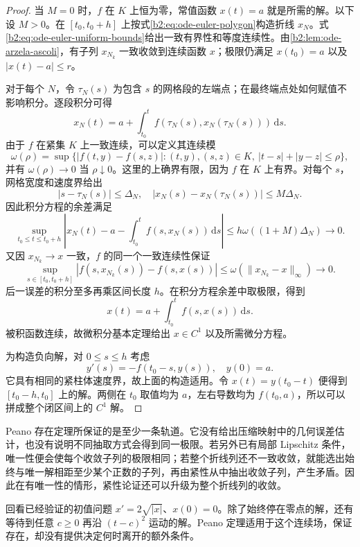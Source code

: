 \begin{proof}
当 \(M=0\) 时，\(f\) 在 \(K\) 上恒为零，常值函数 \(x(t)=a\) 就是所需的解。以下设 \(M>0\)。在 \([t_0,t_0+h]\) 上按式\eqref{b2:eq:ode-euler-polygon}构造折线 \(x_N\)。式\eqref{b2:eq:ode-euler-uniform-bounds}给出一致有界性和等度连续性。由\cref{b2:lem:ode-arzela-ascoli}，有子列 \(x_{N_k}\) 一致收敛到连续函数 \(x\)；极限仍满足 \(x(t_0)=a\) 以及 \(|x(t)-a|\leq r\)。

对于每个 \(N\)，令 \(\tau_N(s)\) 为包含 \(s\) 的网格段的左端点；在最终端点处如何赋值不影响积分。逐段积分可得
\[
 x_N(t)=a+\int_{t_0}^t
       f(\tau_N(s),x_N(\tau_N(s)))\,\mathrm ds.
\]
由于 \(f\) 在紧集 \(K\) 上一致连续，可以定义其连续模
\[
 \omega(\rho)=\sup\bigl\{|f(t,y)-f(s,z)|:
 (t,y),(s,z)\in K,\ |t-s|+|y-z|\leq\rho\bigr\},
\]
并有 \(\omega(\rho)\to0\) 当 \(\rho\downarrow0\)。这里的上确界有限，因为 \(f\) 在 \(K\) 上有界。对每个 \(s\)，网格宽度和速度界给出
\[
 |s-\tau_N(s)|\leq\Delta_N,\quad
 |x_N(s)-x_N(\tau_N(s))|\leq M\Delta_N.
\]
因此积分方程的余差满足
\[
 \sup_{t_0\leq t\leq t_0+h}
 \left|x_N(t)-a-\int_{t_0}^t f(s,x_N(s))\,\mathrm ds\right|
 \leq h\omega((1+M)\Delta_N)\longrightarrow0.
\]
又因 \(x_{N_k}\to x\) 一致，\(f\) 的同一个一致连续性保证
\[
 \sup_{s\in[t_0,t_0+h]}|f(s,x_{N_k}(s))-f(s,x(s))|
 \leq\omega(\|x_{N_k}-x\|_\infty)\longrightarrow0.
\]
后一误差的积分至多再乘区间长度 \(h\)。在积分方程余差中取极限，得到
\[
 x(t)=a+\int_{t_0}^t f(s,x(s))\,\mathrm ds.
\]
被积函数连续，故微积分基本定理给出 \(x\in C^1\) 以及所需微分方程。

为构造负向解，对 \(0\leq s\leq h\) 考虑
\[
 y'(s)=-f(t_0-s,y(s)),\quad y(0)=a.
\]
它具有相同的紧柱体速度界，故上面的构造适用。令 \(x(t)=y(t_0-t)\) 便得到 \([t_0-h,t_0]\) 上的解。两侧在 \(t_0\) 取值均为 \(a\)，左右导数均为 \(f(t_0,a)\)，所以可以拼成整个闭区间上的 \(C^1\) 解。
\end{proof}

Peano 存在定理所保证的是至少一条轨道。它没有给出压缩映射中的几何误差估计，也没有说明不同抽取方式会得到同一极限。若另外已有局部 Lipschitz 条件，唯一性便会使每个收敛子列的极限相同；若整个折线列还不一致收敛，就能选出始终与唯一解相距至少某个正数的子列，再由紧性从中抽出收敛子列，产生矛盾。因此在有唯一性的情形，紧性论证还可以升级为整个折线列的收敛。

\ProseParagraphBreak

回看已经验证的初值问题 \(x'=2\sqrt{|x|}\)、\(x(0)=0\)。除了始终停在零点的解，还有等待到任意 \(c\geq0\) 再沿 \((t-c)^2\) 运动的解。Peano 定理适用于这个连续场，保证存在，却没有提供决定何时离开的额外条件。


